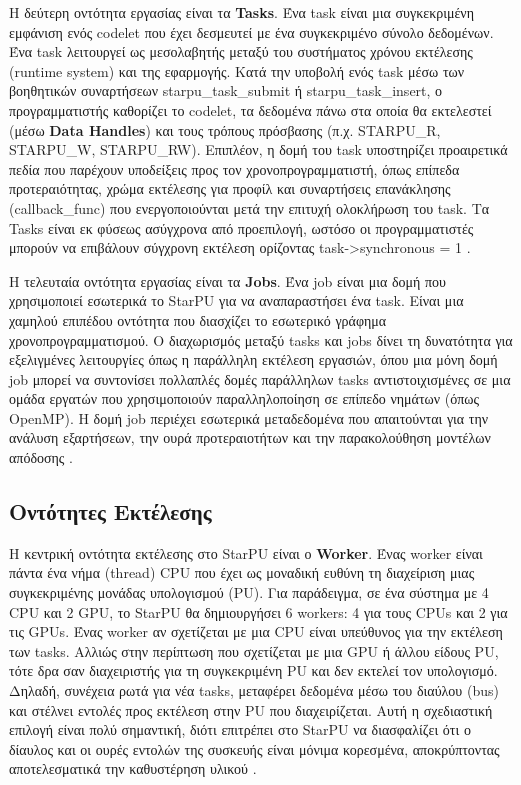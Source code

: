 Η δεύτερη οντότητα εργασίας είναι τα \textbf{Tasks}. Ένα task είναι μια συγκεκριμένη εμφάνιση ενός codelet που έχει δεσμευτεί με ένα συγκεκριμένο σύνολο δεδομένων. Ένα task λειτουργεί ως μεσολαβητής μεταξύ του συστήματος χρόνου εκτέλεσης (runtime system) και της εφαρμογής. Κατά την υποβολή ενός task μέσω των βοηθητικών συναρτήσεων starpu\_task\_submit ή starpu\_task\_insert, ο προγραμματιστής καθορίζει το codelet, τα δεδομένα πάνω στα οποία θα εκτελεστεί (μέσω \textbf{Data Handles}) και τους τρόπους πρόσβασης (π.χ. STARPU\_R, STARPU\_W, STARPU\_RW). Επιπλέον, η δομή του task υποστηρίζει προαιρετικά πεδία που παρέχουν υποδείξεις προς τον χρονοπρογραμματιστή, όπως επίπεδα προτεραιότητας, χρώμα εκτέλεσης για προφίλ και συναρτήσεις επανάκλησης (callback\_func) που ενεργοποιούνται μετά την επιτυχή ολοκλήρωση του task. Τα Tasks είναι εκ φύσεως ασύγχρονα από προεπιλογή, ωστόσο οι προγραμματιστές μπορούν να επιβάλουν σύγχρονη εκτέλεση ορίζοντας task->synchronous = 1 \cite{starpu2025handbook, starpu_dev_manual, starpu_website}.

Η τελευταία οντότητα εργασίας είναι τα \textbf{Jobs}. Ένα job είναι μια δομή που χρησιμοποιεί εσωτερικά το StarPU για να αναπαραστήσει ένα task. Είναι μια χαμηλού επιπέδου οντότητα που διασχίζει το εσωτερικό γράφημα χρονοπρογραμματισμού. Ο διαχωρισμός μεταξύ tasks και jobs δίνει τη δυνατότητα για εξελιγμένες λειτουργίες όπως η παράλληλη εκτέλεση εργασιών, όπου μια μόνη δομή job μπορεί να συντονίσει πολλαπλές δομές παράλληλων tasks αντιστοιχισμένες σε μια ομάδα εργατών που χρησιμοποιούν παραλληλοποίηση σε επίπεδο νημάτων (όπως OpenMP). Η δομή job περιέχει εσωτερικά μεταδεδομένα που απαιτούνται για την ανάλυση εξαρτήσεων, την ουρά προτεραιοτήτων και την παρακολούθηση μοντέλων απόδοσης \cite{starpu2025handbook, starpu_dev_manual, starpu_website}. 

\subsection{Οντότητες Εκτέλεσης}

Η κεντρική οντότητα εκτέλεσης στο StarPU είναι ο \textbf{Worker}. Ένας worker είναι πάντα ένα νήμα (thread) CPU που έχει ως μοναδική ευθύνη τη διαχείριση μιας συγκεκριμένης μονάδας υπολογισμού (PU). Για παράδειγμα, σε ένα σύστημα με 4 CPU και 2 GPU, το StarPU θα δημιουργήσει 6 workers: 4 για τους CPUs και 2 για τις GPUs. Ένας worker αν σχετίζεται με μια CPU είναι υπεύθυνος για την εκτέλεση των tasks. Αλλιώς στην περίπτωση που σχετίζεται με μια GPU ή άλλου είδους PU, τότε δρα σαν διαχειριστής για τη συγκεκριμένη PU και δεν εκτελεί τον υπολογισμό. Δηλαδή, συνέχεια ρωτά για νέα tasks, μεταφέρει δεδομένα μέσω του διαύλου (bus) και στέλνει εντολές προς εκτέλεση στην PU που διαχειρίζεται. Αυτή η σχεδιαστική επιλογή είναι πολύ σημαντική, διότι επιτρέπει στο StarPU να διασφαλίζει ότι ο δίαυλος και οι ουρές εντολών της συσκευής είναι μόνιμα κορεσμένα, αποκρύπτοντας αποτελεσματικά την καθυστέρηση υλικού \cite{starpu_dev_manual, starpu2025handbook, augonnet2010data}. 

